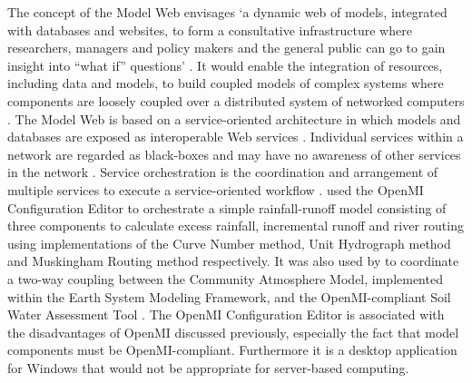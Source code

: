 \documentclass{icldt}\usepackage[]{graphicx}\usepackage[]{color}
\begin{document}
The concept of the Model Web envisages `a dynamic web of models, integrated with databases and websites, to form a consultative infrastructure where researchers, managers and policy makers and the general public can go to gain insight into ``what if'' questions' \citep{bastin2013,geller2007}. It would enable the integration of resources, including data and models, to build coupled models of complex systems where components are loosely coupled over a distributed system of networked computers \citep{geller2007,goodall2011,bastin2013}. The Model Web is based on a service-oriented architecture in which models and databases are exposed as interoperable Web services \citep{castranova2013,nativi2013,schade2012}. Individual services within a network are regarded as black-boxes and may have no awareness of other services in the network \citep{barbosa2009}. Service orchestration is the coordination and arrangement of multiple services to execute a service-oriented workflow \citep{barbosa2009}. \citet{goodall2011} used the OpenMI Configuration Editor to orchestrate a simple rainfall-runoff model consisting of three components to calculate excess rainfall, incremental runoff and river routing using implementations of the Curve Number method, Unit Hydrograph method and Muskingham Routing method respectively. It was also used by \citet{goodall2013} to coordinate a two-way coupling between the Community Atmosphere Model, implemented within the Earth System Modeling Framework, and the OpenMI-compliant Soil Water Assessment Tool \citep{betrie2011}. The OpenMI Configuration Editor is associated with the disadvantages of OpenMI discussed previously, especially the fact that model components must be OpenMI-compliant. Furthermore it is a desktop application for Windows that would not be appropriate for server-based computing. \\
\end{document}

